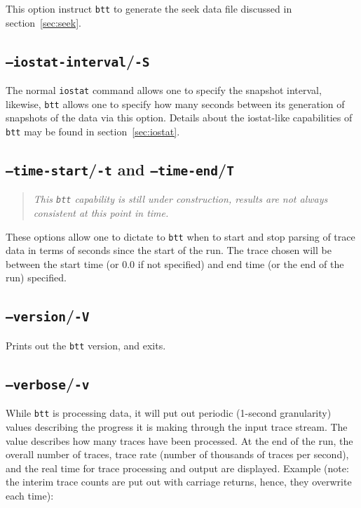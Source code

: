 \documentclass{article}
\begin{document}
  This option instruct \texttt{btt} to generate the seek data file
  discussed in section~\ref{sec:seek}.

\subsection{\label{sec:o-S}\texttt{--iostat-interval}/\texttt{-S}}

  The normal \texttt{iostat} command allows one to specify the snapshot
  interval, likewise, \texttt{btt} allows one to specify how many seconds
  between its generation of snapshots of the data via this option. Details
  about the iostat-like capabilities of \texttt{btt} may be found in
  section~\ref{sec:iostat}.

\subsection{\label{sec:o-tT}\texttt{--time-start}/\texttt{-t} and
\texttt{--time-end}/\texttt{T}}

  \begin{quote}
    \emph{This \texttt{btt} capability is still under construction, results are
    not always consistent at this point in time.}
  \end{quote}

  These options allow one to dictate to \texttt{btt} when to start and stop
  parsing of trace data in terms of seconds since the start of the run. The
  trace chosen will be between the start time (or 0.0 if not
  specified) and end time (or the end of the run) specified. 

\subsection{\label{sec:o-V}\texttt{--version}/\texttt{-V}}

  Prints out the \texttt{btt} version, and exits.

\subsection{\label{sec:o-v}\texttt{--verbose}/\texttt{-v}}

  While \texttt{btt} is processing data, it will put out periodic (1-second
  granularity) values describing the progress it is making through the
  input trace stream. The value describes how many traces have been
  processed. At the end of the run, the overall number of traces, trace
  rate (number of thousands of traces per second), and the real time for
  trace processing and output are displayed. Example (note: the interim
  trace counts are put out with carriage returns, hence, they overwrite
  each time):
\end{document}
